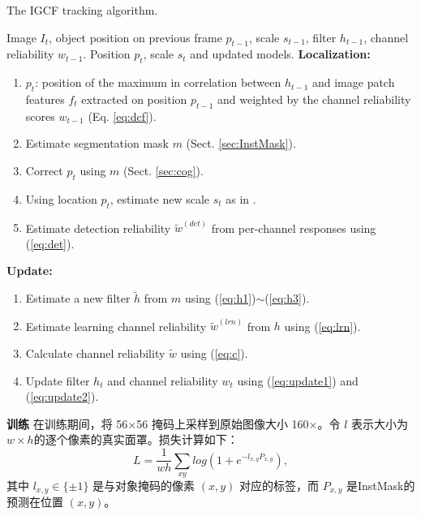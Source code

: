 \begin{algorithm}
  \caption{The IGCF tracking algorithm.} 
  \begin{algorithmic}
    \Require Image $I_t$, object position on previous frame $p_{t-1}$, scale $s_{t-1}$, filter $h_{t-1}$, channel reliability $w_{t-1}$.
    \Ensure Position $p_t$, scale $s_t$ and updated models.
  \Statex
  \State \textbf{Localization:}
  \begin{enumerate}[leftmargin=0pt,itemindent=1.5em]
    \item $p_t$: position of the maximum in correlation between $h_{t-1}$ and image patch features $f_{t}$ extracted on position $p_{t-1}$ and weighted by the channel reliability scores $w_{t-1}$ (Eq. \ref{eq:dcf}).
    \item Estimate segmentation mask $m$ (Sect. \ref{sec:InstMask}).
    \item Correct $p_t$ using $m$ (Sect. \ref{sec:cog}).
    \item Using location $p_t$, estimate new scale $s_ t$ as in \cite{Danelljan2014AccurateSE}.
    \item Estimate detection reliability $\tilde{w}^{(det)}$  from per-channel responses using (\ref{eq:det}).
  \end{enumerate}
  \State \textbf{Update:}
  \begin{enumerate}[leftmargin=0pt,itemindent=1.5em]
    \item Estimate a new filter $\tilde{h}$ from $m$ using (\ref{eq:h1})$\sim$(\ref{eq:h3}).
    \item Estimate learning channel reliability $\tilde{w}^{(lrn)}$ from $h$ using (\ref{eq:lrn}).
    \item Calculate channel reliability $\tilde{w}$ using (\ref{eq:c}).
    \item Update filter $h_t$ and channel reliability $w_t$ using (\ref{eq:update1}) and (\ref{eq:update2}).
  \end{enumerate}
\end{algorithmic}
\end{algorithm}

\textbf{训练} 在训练期间，将 56$\times$56 掩码上采样到原始图像大小 160$\times$。令 $l$ 表示大小为 $w \times h$的逐个像素的真实面罩。损失计算如下：
\begin{equation}
L = \frac{1}{wh} \sum_{xy}{log(1+e^{-l_{x,y}P_{x,y}})},
\end{equation}
其中 $l_{x,y} \in \{ \pm 1 \}$ 是与对象掩码的像素 $(x,y)$ 对应的标签，而 $P_{x,y}$ 是InstMask的预测在位置 $(x,y)$。

